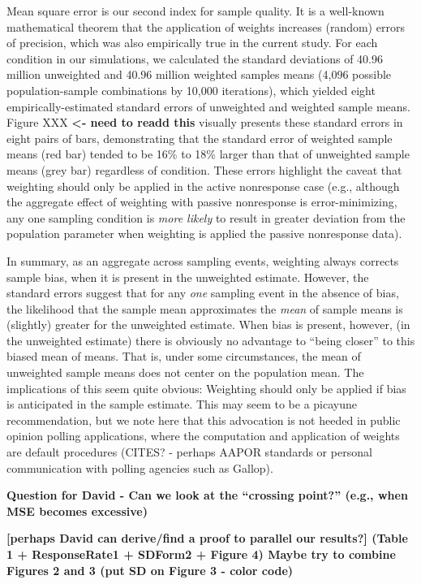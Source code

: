 \documentclass[
  man,mask]{apa7}
\begin{document}
Mean square error is our second index for sample quality. It is a well-known mathematical theorem that the application of weights increases (random) errors of precision, which was also empirically true in the current study. For each condition in our simulations, we calculated the standard deviations of 40.96 million unweighted and 40.96 million weighted samples means (4,096 possible population-sample combinations by 10,000 iterations), which yielded eight empirically-estimated standard errors of unweighted and weighted sample means. Figure XXX \textbf{\textless- need to readd this} visually presents these standard errors in eight pairs of bars, demonstrating that the standard error of weighted sample means (red bar) tended to be 16\% to 18\% larger than that of unweighted sample means (grey bar) regardless of condition. These errors highlight the caveat that weighting should only be applied in the active nonresponse case (e.g., although the aggregate effect of weighting with passive nonresponse is error-minimizing, any one sampling condition is \emph{more likely} to result in greater deviation from the population parameter when weighting is applied the passive nonresponse data).

In summary, as an aggregate across sampling events, weighting always corrects sample bias, when it is present in the unweighted estimate. However, the standard errors suggest that for any \emph{one} sampling event in the absence of bias, the likelihood that the sample mean approximates the \emph{mean} of sample means is (slightly) greater for the unweighted estimate. When bias is present, however, (in the unweighted estimate) there is obviously no advantage to ``being closer'' to this biased mean of means. That is, under some circumstances, the mean of unweighted sample means does not center on the population mean. The implications of this seem quite obvious: Weighting should only be applied if bias is anticipated in the sample estimate. This may seem to be a picayune recommendation, but we note here that this advocation is not heeded in public opinion polling applications, where the computation and application of weights are default procedures (CITES? - perhaps AAPOR standards or personal communication with polling agencies such as Gallop).

\textbf{Question for David - Can we look at the ``crossing point?'' (e.g., when MSE becomes excessive)}

\textbf{{[}perhaps David can derive/find a proof to parallel our results?{]} (Table 1 + ResponseRate1 + SDForm2 + Figure 4) Maybe try to combine Figures 2 and 3 (put SD on Figure 3 - color code)}
\end{document}
